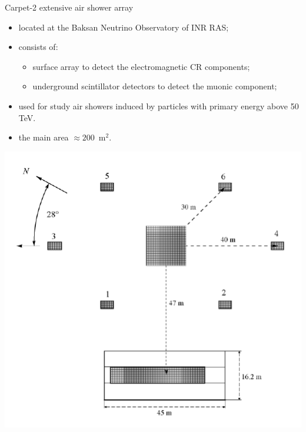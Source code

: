 \begin{frame}{Carpet-2 extensive air shower array}
\begin{itemize}
 \item located at the Baksan Neutrino Observatory of INR RAS;
\end{itemize}
\vspace{-0.3em}
\begin{minipage}[c]{0.5\textwidth}
\begin{itemize}
 \item consists of:
 \begin{itemize}
  \item surface array to detect the electromagnetic CR components;
  \item underground scintillator detectors to detect the muonic component;
 \end{itemize}
\item used for study air showers induced by particles with primary energy above 50 TeV.
\item the main area $\approx 200$~m$^2$.
\end{itemize}
\end{minipage}
\hfill
\begin{minipage}[c]{0.49\textwidth}
\includegraphics[width=1\textwidth]{pics/CarpetLayout.pdf}
\end{minipage}
\end{frame}

